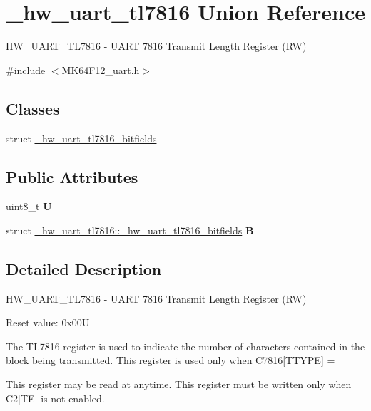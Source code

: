 \hypertarget{union__hw__uart__tl7816}{}\section{\+\_\+hw\+\_\+uart\+\_\+tl7816 Union Reference}
\label{union__hw__uart__tl7816}


H\+W\+\_\+\+U\+A\+R\+T\+\_\+\+T\+L7816 -\/ U\+A\+RT 7816 Transmit Length Register (RW)  




{\ttfamily \#include $<$M\+K64\+F12\+\_\+uart.\+h$>$}

\subsection*{Classes}
\begin{DoxyCompactItemize}
\item 
struct \hyperlink{struct__hw__uart__tl7816_1_1__hw__uart__tl7816__bitfields}{\+\_\+hw\+\_\+uart\+\_\+tl7816\+\_\+bitfields}
\end{DoxyCompactItemize}
\subsection*{Public Attributes}
\begin{DoxyCompactItemize}
\item 
uint8\+\_\+t {\bfseries U}\hypertarget{union__hw__uart__tl7816_a77487d65f13c9e3f4142170328d04e43}{}\label{union__hw__uart__tl7816_a77487d65f13c9e3f4142170328d04e43}

\item 
struct \hyperlink{struct__hw__uart__tl7816_1_1__hw__uart__tl7816__bitfields}{\+\_\+hw\+\_\+uart\+\_\+tl7816\+::\+\_\+hw\+\_\+uart\+\_\+tl7816\+\_\+bitfields} {\bfseries B}\hypertarget{union__hw__uart__tl7816_a19ea90a2b3395294de27e716e9d1b2fe}{}\label{union__hw__uart__tl7816_a19ea90a2b3395294de27e716e9d1b2fe}

\end{DoxyCompactItemize}


\subsection{Detailed Description}
H\+W\+\_\+\+U\+A\+R\+T\+\_\+\+T\+L7816 -\/ U\+A\+RT 7816 Transmit Length Register (RW) 

Reset value\+: 0x00U

The T\+L7816 register is used to indicate the number of characters contained in the block being transmitted. This register is used only when C7816\mbox{[}T\+T\+Y\+PE\mbox{]} =
\begin{DoxyEnumerate}
\item This register may be read at anytime. This register must be written only when C2\mbox{[}TE\mbox{]} is not enabled. 
\end{DoxyEnumerate}

